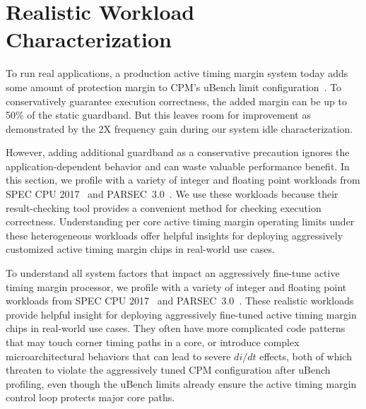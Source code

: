 
\section{Realistic Workload \\Characterization}
\label{sec:process:realistic}

To run real applications, a production active timing margin system today adds some amount of protection margin to CPM's uBench limit configuration~\cite{lefurgy2011active}. To conservatively guarantee execution correctness, the added margin can be up to 50\% of the static guardband. But this leaves room for improvement as demonstrated by the 2X frequency gain during our system idle characterization. 

However, adding additional guardband as a conservative precaution ignores the application-dependent behavior and can waste valuable performance benefit. In this section, we profile with a variety of integer and floating point workloads from SPEC CPU 2017~\cite{SPEC2017} and PARSEC~3.0~\cite{bienia2008parsec}. We use these workloads because their result-checking tool provides a convenient method for checking execution correctness. Understanding per core active timing margin operating limits under these heterogeneous workloads offer helpful insights for deploying aggressively customized active timing margin chips in real-world use cases.

To understand all system factors that impact an aggressively fine-tune active timing margin processor, we profile with a variety of integer and floating point workloads from SPEC CPU 2017~\cite{SPEC2017} and PARSEC~3.0~\cite{bienia2008parsec}. These realistic workloads provide helpful insight for deploying aggressively fine-tuned active timing margin chips in real-world use cases. They often have more complicated code patterns that may touch corner timing paths in a core, or introduce complex microarchitectural behaviors that can lead to severe $di/dt$ effects, both of which threaten to violate the aggressively tuned CPM configuration after uBench profiling, even though the uBench limits already ensure the active timing margin control loop protects major core paths. 

